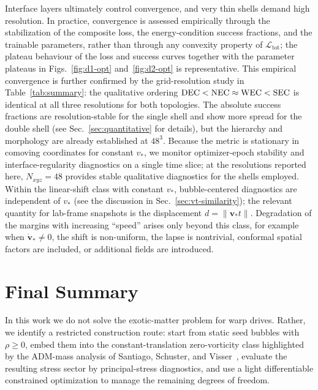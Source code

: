 \documentclass[11pt]{article}
\makeatletter
\newcommand{\@abbr}[1]{\ifmmode\mathrm{#1}\else\textsc{#1}\fi}
\newcommand{\WEC}{\@abbr{WEC}}
\newcommand{\NEC}{\@abbr{NEC}}
\newcommand{\SEC}{\@abbr{SEC}}
\newcommand{\DEC}{\@abbr{DEC}}
\makeatother
\begin{document}
Interface layers ultimately control convergence, and very thin shells demand high resolution. In practice, convergence is assessed empirically through the stabilization of the composite loss, the energy-condition success fractions, and the trainable parameters, rather than through any convexity property of $\mathcal{L}_\text{tot}$; the plateau behaviour of the loss and success curves together with the parameter plateaus in Figs.~\ref{fig:d1-opt} and~\ref{fig:d2-opt} is representative. This empirical convergence is further confirmed by the grid-resolution study in Table~\ref{tab:summary}: the qualitative ordering $\DEC < \NEC \approx \WEC < \SEC$ is identical at all three resolutions for both topologies. The absolute success fractions are resolution-stable for the single shell and show more spread for the double shell (see Sec.~\ref{sec:quantitative} for details), but the hierarchy and morphology are already established at $48^3$. Because the metric is stationary in comoving coordinates for constant $v_*$, we monitor optimizer-epoch stability and interface-regularity diagnostics on a single time slice; at the resolutions reported here, $N_{xyz}=48$ provides stable qualitative diagnostics for the shells employed. Within the linear-shift class with constant $v_*$, bubble-centered diagnostics are independent of $v_*$ (see the discussion in Sec.~\ref{sec:vt-similarity}); the relevant quantity for lab-frame snapshots is the displacement $d=\|\mathbf v_* t\|$. Degradation of the margins with increasing ``speed'' arises only beyond this class, for example when $\dot{\mathbf v}_* \neq 0$, the shift is non-uniform, the lapse is nontrivial, conformal spatial factors are included, or additional fields are introduced.

\section{Final Summary}
\label{sec:conclusions}

In this work we do not solve the exotic-matter problem for warp drives. Rather, we identify a restricted construction route: start from static seed bubbles with $\rho\ge 0$, embed them into the constant-translation zero-vorticity class highlighted by the ADM-mass analysis of Santiago, Schuster, and Visser~\cite{Santiago:2021aup,Schuster:2023ADMmass}, evaluate the resulting stress sector by principal-stress diagnostics, and use a light differentiable constrained optimization to manage the remaining degrees of freedom.
\end{document}
